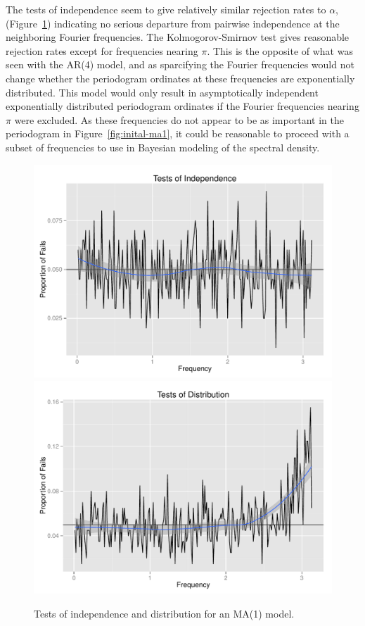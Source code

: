 \documentclass{article}\usepackage{graphicx, color}
\newenvironment{knitrout}{}{} %
\theoremstyle{plain}
\begin{document}
The tests of independence seem to give relatively similar rejection rates to $\alpha$, (Figure~\ref{fig:tests-ma1}) indicating no serious departure from pairwise independence at the neighboring Fourier frequencies. The Kolmogorov-Smirnov test gives reasonable rejection rates except for frequencies nearing $\pi$. This is the opposite of what was seen with the AR(4) model, and as sparcifying the Fourier frequencies would not change whether the periodogram ordinates at these frequencies are exponentially distributed. This model would only result in asymptotically independent exponentially distributed periodogram ordinates if the Fourier frequencies nearing $\pi$ were excluded. As these frequencies do not appear to be as important in the periodogram in Figure~\ref{fig:inital-ma1}, it could be reasonable to proceed with a subset of frequencies to use in Bayesian modeling of the spectral density. 

\begin{knitrout}
\color{fgcolor}\begin{figure}[H]

\includegraphics[width=.49\textwidth]{figure/tests-ma11} 
\includegraphics[width=.49\textwidth]{figure/tests-ma12} \caption[Tests of independence and distribution for an MA(1) model]{Tests of independence and distribution for an MA(1) model.\label{fig:tests-ma1}}
\end{figure}


\end{knitrout}


% 
% 
\end{document}
